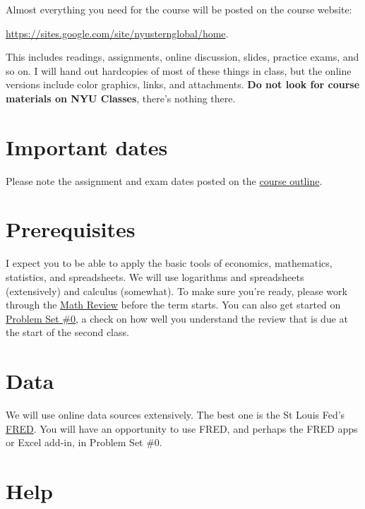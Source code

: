 \documentclass[12pt]{article}
\begin{document}
Almost everything you need for the course will be posted on the course website:

\vspace*{\parskip}
\centerline{\url{https://sites.google.com/site/nyusternglobal/home}.}

This includes readings, assignments, online discussion,
slides, practice exams, and so on.
I will hand out hardcopies of most of these things in class,
but the online versions include color graphics, links, and attachments.
{\bf Do not look for course materials on NYU Classes},
there's nothing there.

\section{Important dates}

Please note the assignment and exam dates posted on the
\href{https://sites.google.com/site/nyusternglobal/home/outline}{course outline}.


\section{Prerequisites}

I expect you to be able to apply the basic tools of economics,
mathematics, statistics, and spreadsheets.  We will use
logarithms and spreadsheets (extensively) and calculus (somewhat).
To make sure you're ready,
please work through the
\href{http://www.stern.nyu.edu/~dbackus/2303/notes_math.pdf}{Math Review}
before the term starts.
You can also get started on
\href{http://www.stern.nyu.edu/~dbackus/2303/ps0_f14.pdf}{Problem Set \#0}, %
a check on how well you understand the review
that is due at the start of the second class.

\section{Data}

We will use online data sources extensively.
%
The best one is the St Louis Fed's
\href{http://research.stlouisfed.org/fred2/}{FRED}.
You will have an opportunity to use FRED, and perhaps the FRED apps or Excel add-in,
in Problem Set \#0.



\section{Help}
\end{document}
